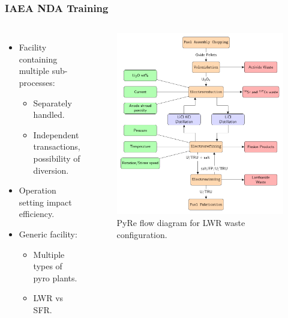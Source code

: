 \begin{frame}
\frametitle{IAEA NDA Training}
\begin{columns}
	\column[t]{5cm}
	\begin{itemize}
		\item Facility containing multiple sub-processes:
		\begin{itemize}
			\item Separately handled.
			\item Independent transactions, possibility of diversion.
		\end{itemize}
		\item Operation setting impact efficiency.
		\item Generic facility:
		\begin{itemize}
			\item Multiple types of pyro plants.
			\item LWR vs SFR.
		\end{itemize}
	\end{itemize}
	\column[t]{6cm}
	\begin{figure}
		\includegraphics[width=\linewidth]{./images/westphal-pyre.pdf}
		\caption{PyRe flow diagram for LWR waste configuration.}
		\label{fig:pyre}
	\end{figure}
\end{columns}
\end{frame}